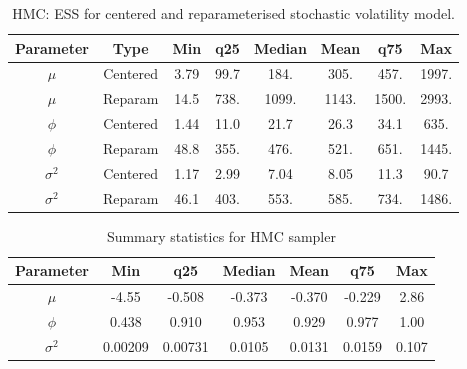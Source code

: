 \documentclass{article}
\begin{document}
\begin{table}[H]
    \centering
    \begin{tabular}{|c|c|c|c|c|c|c|c|} \hline 
    Parameter &  Type&Min& q25&  Median& Mean & q75&Max\\ \hline 
    $\mu$&  Centered&3.79 & 99.7 & 184. & 305. & 457. & 1997.  \\
 $\mu$&  Reparam&14.5 & 738. & 1099. & 1143. & 1500. & 2993.  \\\hline 
 $\phi$&  Centered&1.44 & 11.0 & 21.7 & 26.3 & 34.1 & 635.  \\
 $\phi$&  Reparam&48.8 & 355. & 476. & 521. & 651. & 1445.   \\ \hline 
 $\sigma^2$&  Centered& 1.17 & 2.99 & 7.04 & 8.05 & 11.3 & 90.7 \\ 
 $\sigma^2$&  Reparam&46.1 & 403. & 553. & 585. & 734. & 1486. \\ \hline
    \end{tabular}
    \caption{HMC: ESS for centered and reparameterised stochastic volatility model.}
    \label{tab:hmcess}
\end{table}
\begin{table}
    \centering
    \begin{tabular}{|c|c|c|c|c|c|c|} \hline 
    Parameter& Min& q25&  Median& Mean & q75&Max\\ \hline 
    $\mu$&  -4.55 & -0.508 & -0.373 & -0.370 & -0.229 & 2.86  \\ \hline 
 $\phi$& 0.438 & 0.910 & 0.953 & 0.929 & 0.977 & 1.00  \\ \hline 
 $\sigma^2$& 0.00209 & 0.00731 & 0.0105 & 0.0131 & 0.0159 & 0.107 \\ \hline 
    \end{tabular}
    \caption{Summary statistics for HMC sampler}
    \label{tab:HMCex}
\end{table}
\end{document}
